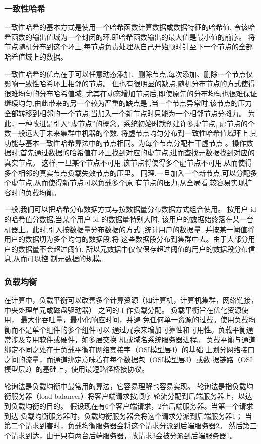\subsubsection{一致性哈希}
一致性哈希的基本方式是使用一个哈希函数计算数据或数据特征的哈希值,
令该哈希函数的输出值域为一个封闭的环,即哈希函数输出的最大值是最小值的前序。
将节点随机分布到这个环上,每节点负责处理从自己开始顺时针至下一个节点的全部哈希值域上的数据。 


一致性哈希的优点在于可以任意动态添加、删除节点,每次添加、删除一个节点仅影响一致性哈希环上相邻的节点。 
但也有很明显的缺点,随机分布节点的方式使得很难均匀的分布哈希值域,
尤其在动态增加节点后,即使原先的分布均匀也很难保证继续均匀,由此带来的另一个较为严重的缺点是
,当一个节点异常时,该节点的压力全部转移到相邻的一个节点,当加入一个新节点时只能为一个相邻节点分摊力。 
为此，一种改进是引入“虚节点”的概念。系统初始时就创建许多虚节点, 虚节点的个数一般远大于未来集群中机器的个数,
将虚节点均匀分布到一致性哈希值域环上,其功能与基本一致性哈希算法中的节点相同。为每个节点分配若干虚节点
。操作数据时,首先通过数据的哈希值在环上找到对应的虚节点,进而查找元数据找到对应的真实节点。
这样,一旦某个节点不可用,该节点将使得多个虚节点不可用,从而使得多个相邻的真实节点负载失效节点的压里。
同理,一旦加入一个新节点,可以分配多个虚节点,从而使得新节点可以负载多个原
有节点的压力,从全局看,较容易实现扩容时的负载均衡。 

一般,我们可以把哈希分布数据方式与按数据量分布数据方式组合使用。
按用户 id 的哈希值分数据,当某个用户 id 的数据量特别大时,
 该用户的数据始终落在某一台机器上。此时,引入按数据量分布数据的方式
 ,统计用户的数据量, 并按某一阈值将用户的数据切为多个均匀的数据段,将
 这些数据段分布到集群中去。由于大部分用 户的数据量不会超过阈值,
 所以元数据中仅仅保存超过阈值的用户的数据段分布信息,从而可以控 制元数据的规模。 
\subsubsection{负载均衡}
在计算中，负载平衡可以改善多个计算资源（如计算机，计算机集群，网络链接，中央处理单元或磁盘驱动器）
之间的工作负载分配。
负载平衡旨在优化资源使用，
最大化吞吐量，最小化响应时间，并避
免任何单一资源的过载。使用负载均衡而不是单个组件的多个组件可以
通过冗余来增加可靠性和可用性。负载平衡通常涉及专用软件或硬件，如多层交换
机或域名系统服务器进程。
负载平衡与通道绑定不同之处在于负载平衡在网络套接字（OSI模型层4）的基础
上划分网络接口之间的流量，而通道绑定意味着在每个数据包（OSI模型层3）或数
据链路（OSI模型层2）的基础上，使用最短路径桥接协议。

轮询法是负载均衡中最常用的算法，它容易理解也容易实现。 
轮询法是指负载均衡服务器（load balancer）将客户端请求按顺序
轮流分配到后端服务器上，以达到负载均衡的目的。 
假设现在有6个客户端请求，2台后端服务器。当第一个请求到达
负载均衡服务器时，负载均衡服务器会将这个请求分派到后端服务器1；
当第二个请求到害时，负载均衡服务器会将这个请求分派到后端服务器2。
然后第三个请求到达，由于只有两台后端服务器，故请求3会被分派到后端服务器1。

